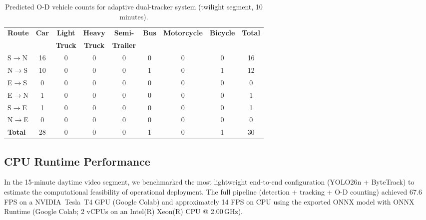 \begin{table}[H]
\caption{Predicted O-D vehicle counts for adaptive dual-tracker system (twilight segment, 10 minutes).}
\centering
\small
\begin{tabular}{l c c c c c c c c}
\toprule
\textbf{Route} & \textbf{Car} & \textbf{Light} & \textbf{Heavy} & \textbf{Semi-} & \textbf{Bus} & \textbf{Motorcycle} & \textbf{Bicycle} & \textbf{Total} \\
 & & \textbf{Truck} & \textbf{Truck} & \textbf{Trailer} &  & \textbf{} & \textbf{} &  \\
\midrule
S$\to$N & 16 & 0 & 0 & 0 & 0 & 0 & 0 & 16 \\
N$\to$S & 10 & 0 & 0 & 0 & 1 & 0 & 1 & 12 \\
E$\to$S & 0  & 0 & 0 & 0 & 0 & 0 & 0 & 0  \\
E$\to$N & 1  & 0 & 0 & 0 & 0 & 0 & 0 & 1  \\
S$\to$E & 1  & 0 & 0 & 0 & 0 & 0 & 0 & 1  \\
N$\to$E & 0  & 0 & 0 & 0 & 0 & 0 & 0 & 0  \\
\bottomrule
\textbf{Total} & 28 & 0 & 0 & 0 & 1 & 0 & 1 & 30 \\
\bottomrule
\end{tabular}

\label{tab:od_twilight_best}
\end{table}

\subsection{CPU Runtime Performance}
In the 15-minute daytime video segment, we benchmarked the most lightweight end-to-end configuration (YOLO26n + ByteTrack) to estimate the computational feasibility of operational deployment. The full pipeline (detection + tracking + O-D counting) achieved 67.6 FPS on a \mbox{NVIDIA Tesla T4} GPU (Google Colab) and approximately 14 FPS on CPU using the exported ONNX model with ONNX Runtime (Google Colab; 2 vCPUs on an Intel(R) Xeon(R) CPU @ 2.00\,GHz).
